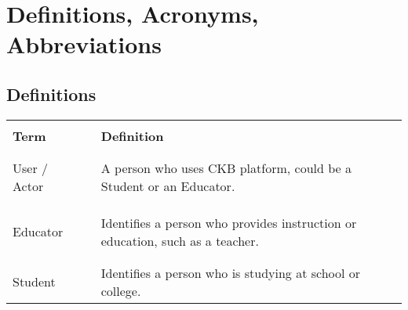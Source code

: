 \section{Definitions, Acronyms, Abbreviations}

\subsection{Definitions}
\begin{table}[H]
    \centering
    \renewcommand{\arraystretch}{0.5}
    \begin{tabular}{l l p{10cm}}
        \hline
                            &        &                                                                                                                              \\
        \textbf{Term}       & \vline & \textbf{Definition}                                                                                                          \\
                            &        &                                                                                                                              \\\hline & & \\
        User / Actor        & \vline & A person who uses CKB platform, could be a Student or an Educator.                                                          \\                                                                                                                                                                                                                                 \\
                            &        &                                                                                                                              \\\hline & & \\
        Educator            & \vline & Identifies a person who provides instruction or education, such as a teacher.                                                \\
                            &        &                                                                                                                              \\\hline & & \\
        Student             & \vline & Identifies a person who is studying at school or college.                                                                    \\

\end{tabular}
\end{table}
